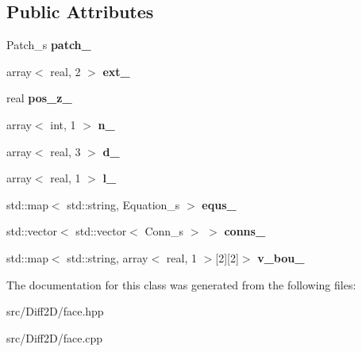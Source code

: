 \subsection*{Public Attributes}
\begin{DoxyCompactItemize}
\item 
\hypertarget{classFace_a2e53c055a4d8492b42995db563e1fc7a}{
Patch\_\-s {\bfseries patch\_\-}}
\label{classFace_a2e53c055a4d8492b42995db563e1fc7a}

\item 
\hypertarget{classFace_a0922668c4175d0274024a5869b310a63}{
array$<$ real, 2 $>$ {\bfseries ext\_\-}}
\label{classFace_a0922668c4175d0274024a5869b310a63}

\item 
\hypertarget{classFace_a639f6d684b3a55d69528b5b6f5976937}{
real {\bfseries pos\_\-z\_\-}}
\label{classFace_a639f6d684b3a55d69528b5b6f5976937}

\item 
\hypertarget{classFace_ab9b865c72ed43ab63dd5747639bd13f1}{
array$<$ int, 1 $>$ {\bfseries n\_\-}}
\label{classFace_ab9b865c72ed43ab63dd5747639bd13f1}

\item 
\hypertarget{classFace_a7d41239f934e8819874b5fb515d43380}{
array$<$ real, 3 $>$ {\bfseries d\_\-}}
\label{classFace_a7d41239f934e8819874b5fb515d43380}

\item 
\hypertarget{classFace_a75033fb2521fcb2c613782f831f42bb3}{
array$<$ real, 1 $>$ {\bfseries l\_\-}}
\label{classFace_a75033fb2521fcb2c613782f831f42bb3}

\item 
\hypertarget{classFace_a46b37a1eaba00ad44cf46b6da1391b30}{
std::map$<$ std::string, Equation\_\-s $>$ {\bfseries equs\_\-}}
\label{classFace_a46b37a1eaba00ad44cf46b6da1391b30}

\item 
\hypertarget{classFace_ac831a8581fa641c54f4adb6e6b3dfe71}{
std::vector$<$ std::vector$<$ Conn\_\-s $>$ $>$ {\bfseries conns\_\-}}
\label{classFace_ac831a8581fa641c54f4adb6e6b3dfe71}

\item 
\hypertarget{classFace_a982045b07b690ea86fc8faa77a1cc534}{
std::map$<$ std::string, array$<$ real, 1 $>$\mbox{[}2\mbox{]}\mbox{[}2\mbox{]}$>$ {\bfseries v\_\-bou\_\-}}
\label{classFace_a982045b07b690ea86fc8faa77a1cc534}

\end{DoxyCompactItemize}


The documentation for this class was generated from the following files:\begin{DoxyCompactItemize}
\item 
src/Diff2D/face.hpp\item 
src/Diff2D/face.cpp\end{DoxyCompactItemize}
